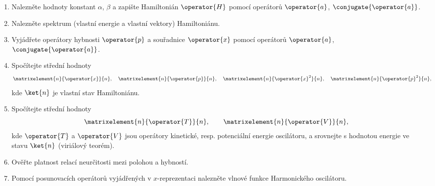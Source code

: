 \begin{enumerate}
\item 
    Nalezněte hodnoty konstant $\alpha$, $\beta$
    a zapište Hamiltonián $\operator{H}$ pomocí operátorů $\operator{a}$, $\conjugate{\operator{a}}$.

\item 
    Nalezněte spektrum (vlastní energie a vlastní vektory) Hamiltoniánu.

\item 
    Vyjádřete operátory hybnosti $\operator{p}$ a souřadnice $\operator{x}$ pomocí operátorů $\operator{a}$, $\conjugate{\operator{a}}$.

\item Spočítejte střední hodnoty 
    \begin{equation}
        \matrixelement{n}{\operator{x}}{n},\quad
        \matrixelement{n}{\operator{p}}{n},\quad
        \matrixelement{n}{\operator{x}^{2}}{n},\quad 
        \matrixelement{n}{\operator{p}^{2}}{n},
    \end{equation}
    kde $\ket{n}$ je vlastní stav Hamiltoniánu.

\item 
    Spočítejte střední hodnoty 
    \begin{equation}
        \matrixelement{n}{\operator{T}}{n},\qquad
        \matrixelement{n}{\operator{V}}{n},
    \end{equation}		
    kde $\operator{T}$ a $\operator{V}$ jsou operátory kinetické, resp. potenciální energie oscilátoru, 
    a srovnejte s hodnotou energie ve stavu $\ket{n}$ (viriálový teorém).

\item 
    Ověřte platnost relací neurčitosti mezi polohou a hybností.

\item 
    Pomocí posunovacích operátorů vyjádřených v $x$-reprezentaci nalezněte vlnové funkce Harmonického oscilátoru.
\end{enumerate}

